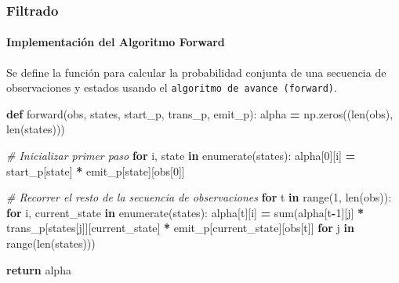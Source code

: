 \documentclass[
  a4paper,
  DIV=11,
  numbers=noendperiod]{scrreprt}
\let\oldparagraph\paragraph
\renewcommand{\paragraph}[1]{\oldparagraph{#1}\mbox{}}
\newenvironment{Shaded}{\begin{snugshade}}{\end{snugshade}}
\newcommand{\BuiltInTok}[1]{#1}
\newcommand{\CommentTok}[1]{\textcolor[rgb]{0.56,0.35,0.01}{\textit{#1}}}
\newcommand{\ControlFlowTok}[1]{\textcolor[rgb]{0.13,0.29,0.53}{\textbf{#1}}}
\newcommand{\DecValTok}[1]{\textcolor[rgb]{0.00,0.00,0.81}{#1}}
\newcommand{\KeywordTok}[1]{\textcolor[rgb]{0.13,0.29,0.53}{\textbf{#1}}}
\newcommand{\NormalTok}[1]{#1}
\newcommand{\OperatorTok}[1]{\textcolor[rgb]{0.81,0.36,0.00}{\textbf{#1}}}
\begin{document}
\subsubsection{Filtrado}\label{filtrado}

\paragraph{Implementación del Algoritmo
Forward}\label{implementaciuxf3n-del-algoritmo-forward}

Se define la función para calcular la probabilidad conjunta de una
secuencia de observaciones y estados usando el
\texttt{algoritmo\ de\ avance\ (forward)}.

\begin{Shaded}
\begin{Highlighting}[numbers=left,,]
\KeywordTok{def}\NormalTok{ forward(obs, states, start\_p, trans\_p, emit\_p):}
\NormalTok{    alpha }\OperatorTok{=}\NormalTok{ np.zeros((}\BuiltInTok{len}\NormalTok{(obs), }\BuiltInTok{len}\NormalTok{(states)))}

    \CommentTok{\# Inicializar primer paso}
    \ControlFlowTok{for}\NormalTok{ i, state }\KeywordTok{in} \BuiltInTok{enumerate}\NormalTok{(states):}
\NormalTok{        alpha[}\DecValTok{0}\NormalTok{][i] }\OperatorTok{=}\NormalTok{ start\_p[state] }\OperatorTok{*}\NormalTok{ emit\_p[state][obs[}\DecValTok{0}\NormalTok{]]}

    \CommentTok{\# Recorrer el resto de la secuencia de observaciones}
    \ControlFlowTok{for}\NormalTok{ t }\KeywordTok{in} \BuiltInTok{range}\NormalTok{(}\DecValTok{1}\NormalTok{, }\BuiltInTok{len}\NormalTok{(obs)):}
        \ControlFlowTok{for}\NormalTok{ i, current\_state }\KeywordTok{in} \BuiltInTok{enumerate}\NormalTok{(states):}
\NormalTok{            alpha[t][i] }\OperatorTok{=} \BuiltInTok{sum}\NormalTok{(alpha[t}\OperatorTok{{-}}\DecValTok{1}\NormalTok{][j] }\OperatorTok{*}\NormalTok{ trans\_p[states[j]][current\_state] }\OperatorTok{*}\NormalTok{ emit\_p[current\_state][obs[t]] }\ControlFlowTok{for}\NormalTok{ j }\KeywordTok{in} \BuiltInTok{range}\NormalTok{(}\BuiltInTok{len}\NormalTok{(states)))}

    \ControlFlowTok{return}\NormalTok{ alpha}
\end{Highlighting}
\end{Shaded}
\end{document}
